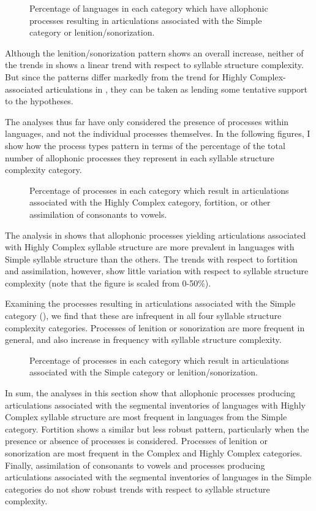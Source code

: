 \begin{figure}
\caption{\label{fig:7.3} Percentage of languages in each category which have allophonic processes resulting in articulations associated with the Simple category or lenition/sonorization.}
\end{figure}
  Although the lenition/sonorization pattern shows an overall increase, neither of the trends in  shows a linear trend with respect to syllable structure complexity. But since the patterns differ markedly from the trend for Highly Complex-associated articulations in , they can be taken as lending some tentative support to the hypotheses.

  The analyses thus far have only considered the presence of processes within languages, and not the individual processes themselves. In the following figures, I show how the process types pattern in terms of the percentage of the total number of allophonic processes they represent in each syllable structure complexity category.

\begin{figure}
\caption{\label{fig:7.4} Percentage of processes in each category which result in articulations associated with the Highly Complex category, fortition, or other assimilation of consonants to vowels.}
\end{figure}

  The analysis in  shows that allophonic processes yielding articulations associated with Highly Complex syllable structure are more prevalent in languages with Simple syllable structure than the others. The trends with respect to fortition and assimilation, however, show little variation with respect to syllable structure complexity (note that the figure is scaled from 0-50\%).

  Examining the processes resulting in articulations associated with the Simple category (), we find that these are infrequent in all four syllable structure complexity categories. Processes of lenition or sonorization are more frequent in general, and also increase in frequency with syllable structure complexity.

\begin{figure}
\caption{\label{fig:7.5} Percentage of processes in each category which result in articulations associated with the Simple category or lenition/sonorization.}
\end{figure}

  In sum, the analyses in this section show that allophonic processes producing articulations associated with the segmental inventories of languages with Highly Complex syllable structure are most frequent in languages from the Simple category. Fortition shows a similar but less robust pattern, particularly when the presence or absence of processes is considered. Processes of lenition or sonorization are most frequent in the Complex and Highly Complex categories. Finally, assimilation of consonants to vowels and processes producing articulations associated with the segmental inventories of languages in the Simple categories do not show robust trends with respect to syllable structure complexity.

